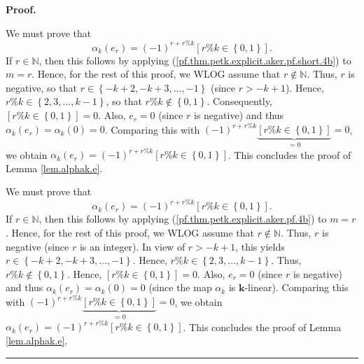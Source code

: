 \documentclass[numbers=enddot,12pt,final,onecolumn,notitlepage]{scrartcl}%
\theoremstyle{definition}
\newenvironment{proof}[1][Proof]{\noindent\textbf{#1.} }{\ \rule{0.5em}{0.5em}}
\newenvironment{verlong}{}{}
\newenvironment{vershort}{}{}
\begin{document}
\begin{proof}
\begin{verlong}
\end{verlong}

\begin{vershort}
We must prove that
\[
\alpha_{k}\left(  e_{r}\right)  =\left(  -1\right)  ^{r+r\%k}\left[
r\%k\in\left\{  0,1\right\}  \right]  .
\]
If $r\in\mathbb{N}$, then this follows by applying
(\ref{pf.thm.petk.explicit.aker.pf.short.4b}) to $m=r$. Hence, for the rest of
this proof, we WLOG assume that $r\notin\mathbb{N}$. Thus, $r$ is negative, so
that $r\in\left\{  -k+2,-k+3,\ldots,-1\right\}  $ (since $r>-k+1$). Hence,
$r\%k\in\left\{  2,3,\ldots,k-1\right\}  $, so that $r\%k\notin\left\{
0,1\right\}  $. Consequently, $\left[  r\%k\in\left\{  0,1\right\}  \right]
=0$. Also, $e_{r}=0$ (since $r$ is negative) and thus $\alpha_{k}\left(
e_{r}\right)  =\alpha_{k}\left(  0\right)  =0$. Comparing this with $\left(
-1\right)  ^{r+r\%k}\underbrace{\left[  r\%k\in\left\{  0,1\right\}  \right]
}_{=0}=0$, we obtain $\alpha_{k}\left(  e_{r}\right)  =\left(  -1\right)
^{r+r\%k}\left[  r\%k\in\left\{  0,1\right\}  \right]  $. This concludes the
proof of Lemma \ref{lem.alphak.e}.
\end{vershort}

\begin{verlong}
We must prove that
\[
\alpha_{k}\left(  e_{r}\right)  =\left(  -1\right)  ^{r+r\%k}\left[
r\%k\in\left\{  0,1\right\}  \right]  .
\]
If $r\in\mathbb{N}$, then this follows by applying
(\ref{pf.thm.petk.explicit.aker.pf.4b}) to $m=r$. Hence, for the rest of this
proof, we WLOG assume that $r\notin\mathbb{N}$. Thus, $r$ is negative (since
$r$ is an integer). In view of $r>-k+1$, this yields $r\in\left\{
-k+2,-k+3,\ldots,-1\right\}  $. Hence, $r\%k\in\left\{  2,3,\ldots
,k-1\right\}  $. Thus, $r\%k\notin\left\{  0,1\right\}  $. Hence, $\left[
r\%k\in\left\{  0,1\right\}  \right]  =0$. Also, $e_{r}=0$ (since $r$ is
negative) and thus $\alpha_{k}\left(  e_{r}\right)  =\alpha_{k}\left(
0\right)  =0$ (since the map $\alpha_{k}$ is $\mathbf{k}$-linear). Comparing
this with $\left(  -1\right)  ^{r+r\%k}\underbrace{\left[  r\%k\in\left\{
0,1\right\}  \right]  }_{=0}=0$, we obtain $\alpha_{k}\left(  e_{r}\right)
=\left(  -1\right)  ^{r+r\%k}\left[  r\%k\in\left\{  0,1\right\}  \right]  $.
This concludes the proof of Lemma \ref{lem.alphak.e}.
\end{verlong}
\end{proof}
\end{document}
